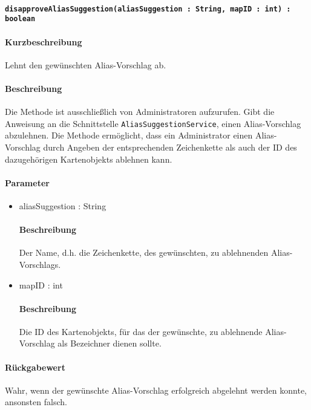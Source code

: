 \paragraph{\texttt{disapproveAliasSuggestion(aliasSuggestion : String, mapID : int) : boolean}}%
\paragraph*{Kurzbeschreibung}
Lehnt den gewünschten Alias-Vorschlag ab.
\paragraph*{Beschreibung}
Die Methode ist ausschließlich von Administratoren aufzurufen.
Gibt die Anweisung an die Schnittstelle \texttt{AliasSuggestionService}, einen Alias-Vorschlag abzulehnen.
Die Methode ermöglicht, dass ein Administrator einen Alias-Vorschlag durch Angeben der entsprechenden Zeichenkette als auch der ID des dazugehörigen Kartenobjekts ablehnen kann.
\paragraph*{Parameter}
\begin{itemize}
	\item aliasSuggestion : String
		\paragraph*{Beschreibung}
		Der Name, d.h. die Zeichenkette, des gewünschten, zu ablehnenden Alias-Vorschlags.
	\item mapID : int
		\paragraph*{Beschreibung}
		Die ID des Kartenobjekts, für das der gewünschte, zu ablehnende Alias-Vorschlag als Bezeichner dienen sollte.
\end{itemize}
\paragraph*{Rückgabewert}
Wahr, wenn der gewünschte Alias-Vorschlag erfolgreich abgelehnt werden konnte, ansonsten falsch.
